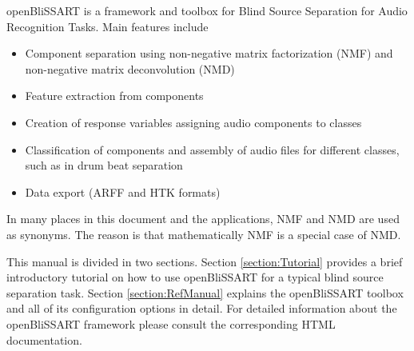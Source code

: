 %
%


openBliSSART is a framework and toolbox for Blind Source Separation for Audio
Recognition Tasks. Main features include

\begin{itemize}
\item Component separation using non-negative matrix factorization (NMF)
  \cite{LeeSeung1999,Smaragdis2003,LeeSeung2001} and non-negative matrix deconvolution
  (NMD) \cite{Smaragdis2004}
\item Feature extraction from components
\item Creation of response variables assigning audio components to classes
\item Classification of components and assembly of audio files for different
  classes, such as in drum beat separation \cite{Virtanen2005}
\item Data export (ARFF \cite{Weka} and HTK \cite{HTKBook} formats)
\end{itemize}

\begin{leftbar}
In many places in this document and the applications, NMF and NMD are used
as synonyms. The reason is that mathematically NMF is a special case of NMD.
\end{leftbar}

This manual is divided in two sections. Section \ref{section:Tutorial} provides
a brief introductory tutorial on how to use openBliSSART for a typical blind
source separation task. Section \ref{section:RefManual} explains the
openBliSSART toolbox and all of its configuration options in detail. For
detailed information about the openBliSSART framework please consult the
corresponding HTML documentation.

